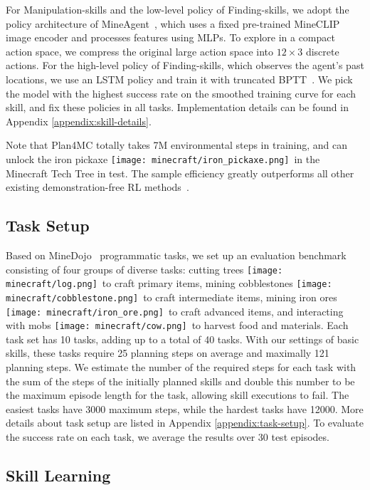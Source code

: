 \documentclass{article}
\newcommand{\mccobblestone}{\texttt{[image: minecraft/cobblestone.png]}}
\newcommand{\mccow}{\texttt{[image: minecraft/cow.png]}}
\newcommand{\mclog}{\texttt{[image: minecraft/log.png]}}
\newcommand{\mcironpickaxe}{\texttt{[image: minecraft/iron\_pickaxe.png]}}
\newcommand{\mcironore}{\texttt{[image: minecraft/iron\_ore.png]}}
\begin{document}
For Manipulation-skills and the low-level policy of Finding-skills, we adopt the policy architecture of MineAgent~\citep{minedojo}, which uses a fixed pre-trained MineCLIP image encoder and processes features using MLPs. To explore in a compact action space, we compress the original large action space into $12\times 3$ discrete actions. For the high-level policy of Finding-skills, which observes the agent's past locations, we use an LSTM policy and train it with truncated BPTT~\citep{truncated-bptt}. We pick the model with the highest success rate on the smoothed training curve for each skill, and fix these policies in all tasks. Implementation details can be found in Appendix \ref{appendix:skill-details}. 

Note that Plan4MC totally takes 7M environmental steps in training, and can unlock the iron pickaxe \mcironpickaxe \ in the Minecraft Tech Tree in test. The sample efficiency greatly outperforms all other existing demonstration-free RL methods~\citep{dreamer-v3, vpt}.

\subsection{Task Setup}
\label{subsec:tasks}

Based on MineDojo~\citep{minedojo} programmatic tasks, we set up an evaluation benchmark consisting of four groups of diverse tasks: cutting trees \mclog \ to craft primary items, mining cobblestones \mccobblestone \ to craft intermediate items, mining iron ores \mcironore \ to craft advanced items, and interacting with mobs \mccow \ to harvest food and materials. Each task set has 10 tasks, adding up to a total of 40 tasks. With our settings of basic skills, these tasks require 25 planning steps on average and maximally 121 planning steps. We estimate the number of the required steps for each task with the sum of the steps of the initially planned skills and double this number to be the maximum episode length for the task, allowing skill executions to fail. The easiest tasks have 3000 maximum steps, while the hardest tasks have 12000. More details about task setup are listed in Appendix \ref{appendix:task-setup}. To evaluate the success rate on each task, we average the results over 30 test episodes.



\subsection{Skill Learning}
\label{subsec:skill-learning}
\end{document}
